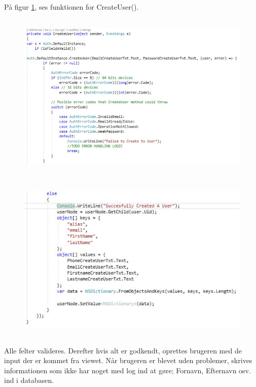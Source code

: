 På figur \ref{fig:CreateUser}, ses funktionen for CreateUser().
\begin{figure}[H] %
	\centering
	\includegraphics[height=8cm, width=17cm]{../ArkitekturDesign/Design/OpretBruger/CreateUser1}
\end{figure}
\begin{figure}[H] %
	\centering
	\includegraphics[height=8cm, width=17cm]{../ArkitekturDesign/Design/OpretBruger/CreateUser2}
	\caption{}
	\label{fig:CreateUser}
\end{figure}
Alle felter valideres. Derefter hvis alt er godkendt, oprettes brugeren med de input der er kommet fra viewet. Når brugeren er blevet uden problemer, skrives informationen som ikke har noget med log ind at gøre; Fornavn, Efternavn osv. ind i databasen.

\clearpage